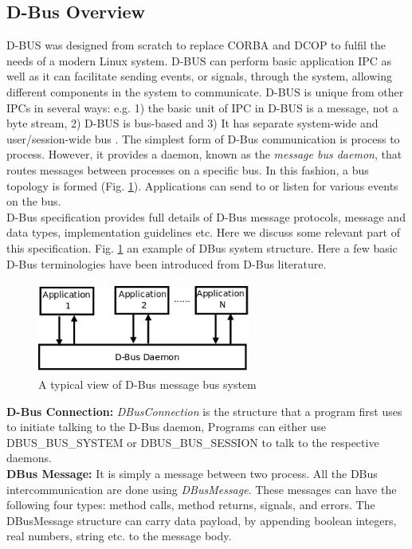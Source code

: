 \documentclass{ifacconf}
\begin{document}
\subsection{D-Bus Overview}
D-BUS was designed from scratch to replace CORBA and DCOP  to fulfil the needs of a modern Linux system. D-BUS can perform basic application IPC as well as it can facilitate sending events, or signals, through the system, allowing different components in the system to communicate. D-BUS is unique from other IPCs in several ways: e.g. 1) the basic unit of IPC in D-BUS is a message, not a byte stream, 2) D-BUS is bus-based and 3) It has separate system-wide and user/session-wide bus \citep{Love2005}. The simplest form of D-Bus communication is process to process. However, it provides a daemon, known as the {\em message bus daemon}, that routes messages between processes on a specific bus. In this fashion, a bus topology is formed (Fig. \ref{fig:dbus-daemon}). Applications can send to or listen for various events on the bus.\\
D-Bus specification \citep{Pennington+2010} provides full details of D-Bus message protocols, message and data types, implementation guidelines etc. Here we discuss some relevant part of this specification. Fig. \ref{fig:dbus-daemon} an example of DBus system structure.
Here a few basic D-Bus terminologies have been introduced from D-Bus literature.\\ 
\begin{figure}
\begin{center}
\includegraphics[width=7cm,height=3.0cm]{./dia-files/dbus-daemon} %
\caption{A typical view of D-Bus message bus system } 
\label{fig:dbus-daemon}
\end{center}
\end{figure}
\textbf{D-Bus Connection: }
\textit{DBusConnection} is the structure that a program first uses to initiate talking to the D-Bus daemon, Programs can either use DBUS\_BUS\_SYSTEM or DBUS\_BUS\_SESSION to talk to the respective daemons.\\
\textbf{DBus Message: }
It is simply a message between two process. All the DBus intercommunication are done using \textit{DBusMessage}. These messages can have the following four types: method calls, method returns, signals, and errors. The DBusMessage structure can carry data payload, by appending boolean integers, real numbers, string etc. to the message body.\\ 
\end{document}
